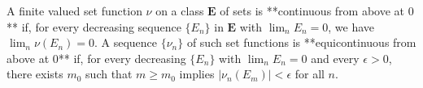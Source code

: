 A finite valued set function $\nu$ on a class $\mathbf{E}$ of sets is **continuous from above at $0$** if, for every decreasing sequence $\{E_n\}$ in $\mathbf{E}$ with $\lim_n E_n = 0$, we have $\lim_n \nu(E_n) = 0$. A sequence $\{\nu_n\}$ of such set functions is **equicontinuous from above at $0$** if, for every decreasing $\{E_n\}$ with $\lim_n E_n = 0$ and every $\epsilon > 0$, there exists $m_0$ such that $m \geq m_0$ implies $|\nu_n(E_m)| < \epsilon$ for all $n$.
